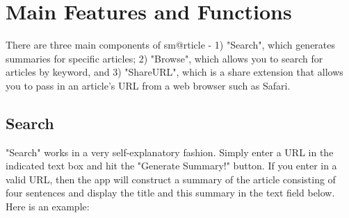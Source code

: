 \documentclass[11pt, margin=1in]{article}
\begin{document}
\newpage


\section{Main Features and Functions}

There are three main components of sm@rticle - 1) "Search", which generates summaries for specific articles; 2) "Browse", which allows you to search for articles by keyword, and 3) "ShareURL", which is a share extension that allows you to pass in an article's URL from a web browser such as Safari.  

\subsection{Search}
"Search" works in a very self-explanatory fashion.  Simply enter a URL in the indicated text box and hit the "Generate Summary!" button.  If you enter in a valid URL, then the app will construct a summary of the article consisting of four sentences and display the title and this summary in the text field below.  Here is an example: 
\end{document}
